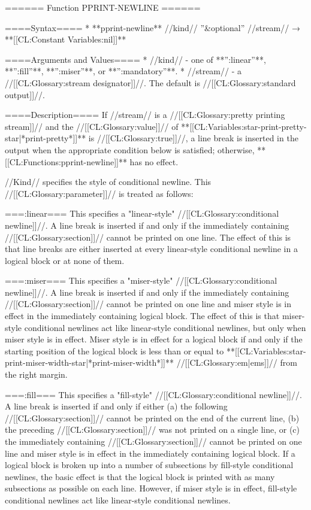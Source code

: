 ====== Function PPRINT-NEWLINE ======

====Syntax====
  * **pprint-newline** //kind// ''&optional'' //stream// → **[[CL:Constant Variables:nil]]**

====Arguments and Values====
  * //kind// - one of **'':linear''**, **'':fill''**, **'':miser''**, or **'':mandatory''**.
  * //stream// - a //[[CL:Glossary:stream designator]]//. The default is //[[CL:Glossary:standard output]]//.

====Description====
If //stream// is a //[[CL:Glossary:pretty printing stream]]// and the //[[CL:Glossary:value]]// of **[[CL:Variables:star-print-pretty-star|*print-pretty*]]** is //[[CL:Glossary:true]]//, a line break is inserted in the output when the appropriate condition below is satisfied; otherwise, **[[CL:Functions:pprint-newline]]** has no effect.

//Kind// specifies the style of conditional newline. This //[[CL:Glossary:parameter]]// is treated as follows:

===:linear===
This specifies a "linear-style" //[[CL:Glossary:conditional newline]]//. A line break is inserted if and only if the immediately containing //[[CL:Glossary:section]]// cannot be printed on one line. The effect of this is that line breaks are either inserted at every linear-style conditional newline in a logical block or at none of them.

===:miser===
This specifies a "miser-style" //[[CL:Glossary:conditional newline]]//. A line break is inserted if and only if the immediately containing //[[CL:Glossary:section]]// cannot be printed on one line and miser style is in effect in the immediately containing logical block. The effect of this is that miser-style conditional newlines act like linear-style conditional newlines, but only when miser style is in effect. Miser style is in effect for a logical block if and only if the starting position of the logical block is less than or equal to **[[CL:Variables:star-print-miser-width-star|*print-miser-width*]]** //[[CL:Glossary:em|ems]]// from the right margin.

===:fill===
This specifies a "fill-style" //[[CL:Glossary:conditional newline]]//. A line break is inserted if and only if either (a) the following //[[CL:Glossary:section]]// cannot be printed on the end of the current line, (b) the preceding //[[CL:Glossary:section]]// was not printed on a single line, or (c) the immediately containing //[[CL:Glossary:section]]// cannot be printed on one line and miser style is in effect in the immediately containing logical block. If a logical block is broken up into a number of subsections by fill-style conditional newlines, the basic effect is that the logical block is printed with as many subsections as possible on each line. However, if miser style is in effect, fill-style conditional newlines act like linear-style conditional newlines.

